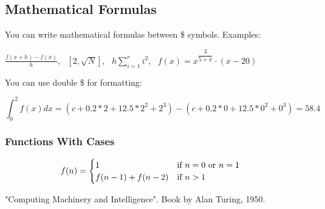 \documentclass[12pt]{article}
\begin{document}
	\cleardoublepage
	
	\subsection{Mathematical Formulas}
	
	You can write mathematical formulas between \$ symbols. Examples:
	
	$\frac{f(x+h) - f(x)}{h}$, \ $[2, \sqrt{N}]$, \ $h\sum_{i=1}^{r}i^{2}$, \ $f(x) = x^{\dfrac{3}{5+x}}\cdot(x-20)$
	
	You can use double \$ for formatting:
	
	$$\int_{0}^{2}f(x)dx = (c + 0.2*2 + 12.5*2^2 + 2^3) - (c + 0.2*0 + 12.5*0^2 + 0^3) = 58.4$$
	
	\subsubsection{Functions With Cases}
	
	\begin{align*}
	f(n) &= \begin{cases}
	1 & \text{if $n = 0$ or $n = 1$\,\, } \\
	f(n - 1) + f(n - 2) & \text{if $n > 1$\,\,}
	\end{cases}
	\end{align*}
	
	\begin{thebibliography}{0}
		
		"Computing Machinery and Intelligence". Book by Alan Turing, 1950.
	\end{thebibliography}
\end{document}
